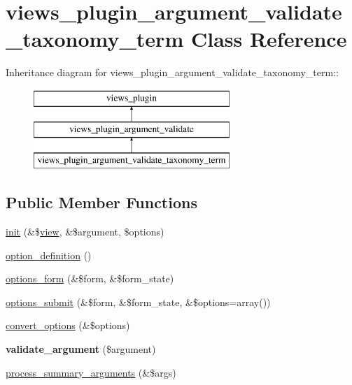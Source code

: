 \hypertarget{classviews__plugin__argument__validate__taxonomy__term}{
\section{views\_\-plugin\_\-argument\_\-validate\_\-taxonomy\_\-term Class Reference}
\label{classviews__plugin__argument__validate__taxonomy__term}
}
Inheritance diagram for views\_\-plugin\_\-argument\_\-validate\_\-taxonomy\_\-term::\begin{figure}[H]
\begin{center}
\leavevmode
\includegraphics[height=3cm]{classviews__plugin__argument__validate__taxonomy__term}
\end{center}
\end{figure}
\subsection*{Public Member Functions}
\begin{DoxyCompactItemize}
\item 
\hyperlink{classviews__plugin__argument__validate__taxonomy__term_af215aeb235ee101b78ceca11f879308d}{init} (\&\$\hyperlink{classview}{view}, \&\$argument, \$options)
\item 
\hyperlink{classviews__plugin__argument__validate__taxonomy__term_a480325496a1e66f3cdeb5fb354ca8746}{option\_\-definition} ()
\item 
\hyperlink{classviews__plugin__argument__validate__taxonomy__term_a01d0dacfd3e605a0466f9eef497b4e8f}{options\_\-form} (\&\$form, \&\$form\_\-state)
\item 
\hyperlink{classviews__plugin__argument__validate__taxonomy__term_a2259ff87ac45f7a4862f89983869f580}{options\_\-submit} (\&\$form, \&\$form\_\-state, \&\$options=array())
\item 
\hyperlink{classviews__plugin__argument__validate__taxonomy__term_aa4bbbfd0ccb6a907f7fa3d2c03d504c6}{convert\_\-options} (\&\$options)
\item 
\hypertarget{classviews__plugin__argument__validate__taxonomy__term_a0f9fe327e689aa9a2323bab307161073}{
{\bfseries validate\_\-argument} (\$argument)}
\label{classviews__plugin__argument__validate__taxonomy__term_a0f9fe327e689aa9a2323bab307161073}

\item 
\hyperlink{classviews__plugin__argument__validate__taxonomy__term_a6019c52239ae10eb1023624c2db9e24f}{process\_\-summary\_\-arguments} (\&\$args)
\end{DoxyCompactItemize}


